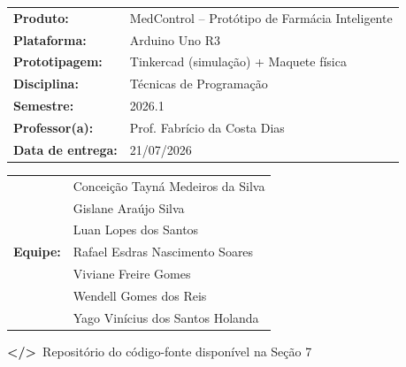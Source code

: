 \documentclass[11pt,a4paper]{article}
\newcommand{\iGit}{\textbf{\textcolor{mcTealDark}{\textless/\textgreater}}}
\begin{document}
\begin{titlepage}
\begin{center}
\renewcommand{\arraystretch}{1.5}
\begin{tabular}{@{} l l @{}}
\textbf{\color{mcTealDark}Produto:} & MedControl -- Protótipo de Farmácia Inteligente \\
\textbf{\color{mcTealDark}Plataforma:} & Arduino Uno R3 \\
\textbf{\color{mcTealDark}Prototipagem:} & Tinkercad (simulação) + Maquete física \\
\textbf{\color{mcTealDark}Disciplina:} & Técnicas de Programação \\
\textbf{\color{mcTealDark}Semestre:} & 2026.1 \\
\textbf{\color{mcTealDark}Professor(a):} & Prof. Fabrício da Costa Dias \\
\textbf{\color{mcTealDark}Data de entrega:} & 21/07/2026 \\
\end{tabular}
\end{center}

\vspace{0.cm}

\begin{center}
\renewcommand{\arraystretch}{1.35}
\begin{tabular}{@{} l l @{}}
\multirow{7}{*}{\textbf{\color{mcTealDark}Equipe:}}
 & Conceição Tayná Medeiros da Silva \\
 & Gislane Araújo Silva \\
 & Luan Lopes dos Santos \\
 & Rafael Esdras Nascimento Soares \\
 & Viviane Freire Gomes \\
 & Wendell Gomes dos Reis \\
 & Yago Vinícius dos Santos Holanda \\
\end{tabular}
\end{center}

\vspace{2.0 cm}

\begin{center}
\color{mcGray}\small \iGit\ Repositório do código-fonte disponível na Seção 7
\end{center}

\restoregeometry
\end{titlepage}

\tableofcontents
\newpage

\end{document}
